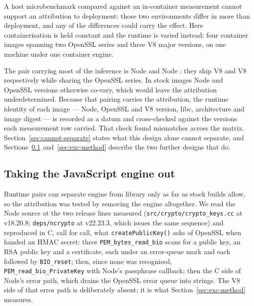 \documentclass[pdflatex,sn-basic,twocolumn]{sn-jnl}%
\begin{document}
A host microbenchmark compared against an in-container measurement cannot
support an attribution to deployment: those two environments differ in more than
deployment, and any of the differences could carry the effect. Here
containerisation is held constant and the runtime is varied instead:
four container images spanning two OpenSSL series and three V8 major versions,
on one machine under one container engine.

The pair carrying most of the inference is Node \NodeEighteenNodeMajor{} and
Node \NodeTwentyNodeMajor: they ship V8 \NodeEighteenVeight{} and V8
\NodeTwentyVeight{} respectively while sharing the OpenSSL
\NodeEighteenOpensslSeries{} series. In stock images Node and OpenSSL versions
otherwise co-vary, which would leave the attribution underdetermined. Because
that pairing carries the attribution, the runtime identity of each image ---
Node, OpenSSL and V8 version, libc, architecture and image digest --- is
recorded as a datum and cross-checked against the versions each measurement row
carried. That check found \IdentityMismatches{} mismatches across the matrix.
Section~\ref{sec:cannot-separate} states what this design alone cannot
separate, and Sections~\ref{sec:c-method} and~\ref{sec:exc-method} describe the
two further designs that do.

\subsection{Taking the JavaScript engine out}\label{sec:c-method}

Runtime pairs can separate engine from library only as far as stock builds
allow, so the attribution was tested by removing the engine altogether. We read
the Node source at the two release lines measured
(\texttt{src/crypto/crypto\_keys.cc} at v18.20.8; \texttt{deps/ncrypto} at
v22.23.3, which issues the same sequence) and reproduced in C, call for call,
what \texttt{createPublicKey()} asks of OpenSSL when handed an HMAC secret:
three \texttt{PEM\_bytes\_read\_bio} scans for a public key, an RSA public key
and a certificate, each under an error-queue mark and each followed by
\texttt{BIO\_reset}; then, since none was recognised,
\texttt{PEM\_read\_bio\_PrivateKey} with Node's passphrase callback; then the
C side of Node's error path, which drains the OpenSSL error queue into
strings. The V8 side of that error path is deliberately absent; it is what
Section~\ref{sec:exc-method} measures.
\end{document}
